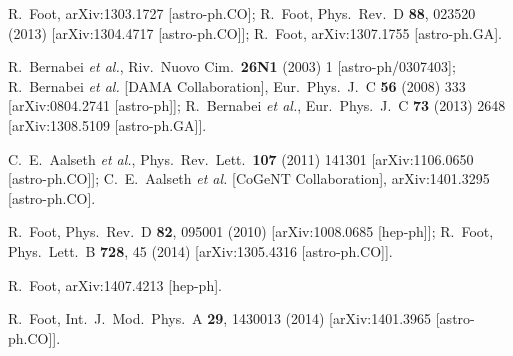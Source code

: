 \documentclass[12pt]{article}
\begin{document}
{{\begin{thebibliography}{999}
 R.~Foot,
  arXiv:1303.1727 [astro-ph.CO];
  R.~Foot,
  Phys.\ Rev.\ D {\bf 88}, 023520 (2013)
  [arXiv:1304.4717 [astro-ph.CO]];
  R.~Foot,
  arXiv:1307.1755 [astro-ph.GA].
 
  
  R.~Bernabei {\it et al.},
  Riv.\ Nuovo Cim.\  {\bf 26N1} (2003) 1
  [astro-ph/0307403];
  R.~Bernabei {\it et al.}  [DAMA Collaboration],
  Eur.\ Phys.\ J.\ C {\bf 56} (2008) 333
  [arXiv:0804.2741 [astro-ph]];
  R.~Bernabei {\it et al.},
  Eur.\ Phys.\ J.\ C {\bf 73} (2013) 2648
  [arXiv:1308.5109 [astro-ph.GA]].
  
  C.~E.~Aalseth {\it et al.},
  Phys.\ Rev.\ Lett.\  {\bf 107} (2011) 141301
  [arXiv:1106.0650 [astro-ph.CO]];
  C.~E.~Aalseth {\it et al.}  [CoGeNT Collaboration],
  arXiv:1401.3295 [astro-ph.CO].
  
  R.~Foot,
  Phys.\ Rev.\ D {\bf 82}, 095001 (2010)
  [arXiv:1008.0685 [hep-ph]];
  R.~Foot,
  Phys.\ Lett.\ B {\bf 728}, 45 (2014)
  [arXiv:1305.4316 [astro-ph.CO]].
  
  R.~Foot,
  arXiv:1407.4213 [hep-ph].
  
  R.~Foot,
  Int.\ J.\ Mod.\ Phys.\ A {\bf 29}, 1430013 (2014)
  [arXiv:1401.3965 [astro-ph.CO]].


\end{thebibliography}}}
\end{document}
